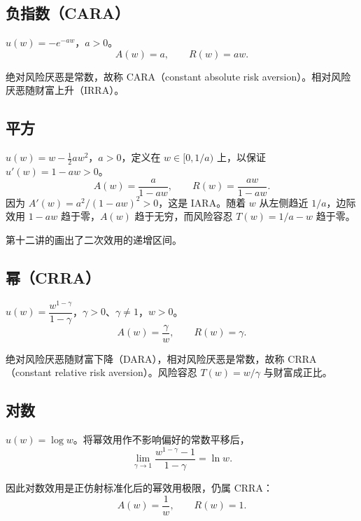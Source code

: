 \subsection{负指数（CARA）}\label{sec:wj-seven-cara}
\begin{tcolorbox}[knowledge]
$u(w)=-e^{-aw}$，$a>0$。
    \[
        A(w)=a,\qquad R(w)=aw.
    \]

    绝对风险厌恶是常数，故称 CARA（constant absolute risk aversion）。相对风险厌恶随财富上升（IRRA）。
\end{tcolorbox}

\subsection{平方}
\begin{tcolorbox}[knowledge]
$u(w)=w-\frac12 aw^{2}$，$a>0$，定义在 $w\in[0,1/a)$ 上，以保证 $u'(w)=1-aw>0$。
    \[
        A(w)=\frac{a}{1-aw},\qquad R(w)=\frac{aw}{1-aw}.
    \]
    因为 $A'(w)=a^2/(1-aw)^2>0$，这是 IARA。随着 $w$ 从左侧趋近 $1/a$，边际效用 $1-aw$ 趋于零，$A(w)$ 趋于无穷，而风险容忍 $T(w)=1/a-w$ 趋于零。
\end{tcolorbox}

第十二讲的画出了二次效用的递增区间。

\subsection{幂（CRRA）}\label{sec:wj-seven-crra}
\begin{tcolorbox}[knowledge]
$u(w)=\dfrac{w^{1-\gamma}}{1-\gamma}$，$\gamma>0$、$\gamma\neq 1$，$w>0$。
    \[
        A(w)=\frac{\gamma}{w},\qquad R(w)=\gamma.
    \]

    绝对风险厌恶随财富下降（DARA），相对风险厌恶是常数，故称 CRRA（constant relative risk aversion）。风险容忍 $T(w)=w/\gamma$ 与财富成正比。
\end{tcolorbox}

\subsection{对数}
\begin{tcolorbox}[knowledge]
$u(w)=\log w$。将幂效用作不影响偏好的常数平移后，
    \[
      \lim_{\gamma\to1}\frac{w^{1-\gamma}-1}{1-\gamma}=\ln w.
    \]

    因此对数效用是正仿射标准化后的幂效用极限，仍属 CRRA：
    \[
        A(w)=\frac{1}{w},\qquad R(w)=1.
    \]
\end{tcolorbox}

